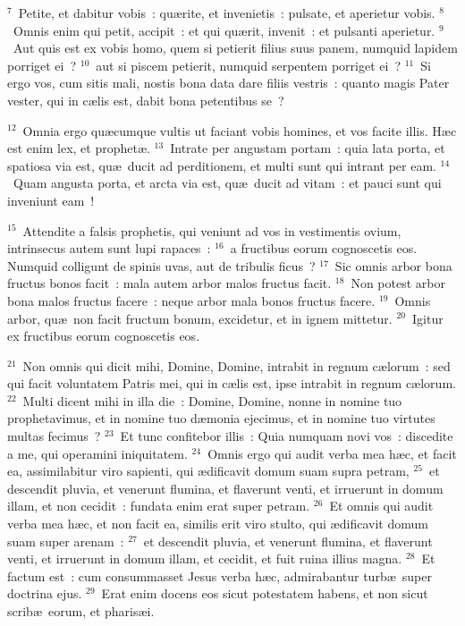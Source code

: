 ${}^{7}$~Petite, et dabitur vobis~: qu\ae rite, et invenietis~: pulsate, et aperietur vobis.
${}^{8}$~Omnis enim qui petit, accipit~: et qui qu\ae rit, invenit~: et pulsanti aperietur.
${}^{9}$~Aut quis est ex vobis homo, quem si petierit filius suus panem, numquid lapidem porriget ei~?
${}^{10}$~aut si piscem petierit, numquid serpentem porriget ei~?
${}^{11}$~Si ergo vos, cum sitis mali, nostis bona data dare filiis vestris~: quanto magis Pater vester, qui in c\ae lis est, dabit bona petentibus se~?


${}^{12}$~Omnia ergo qu\ae cumque vultis ut faciant vobis homines, et vos facite illis. H\ae c est enim lex, et prophet\ae .
${}^{13}$~Intrate per angustam portam~: quia lata porta, et spatiosa via est, qu\ae\ ducit ad perditionem, et multi sunt qui intrant per eam.
${}^{14}$~Quam angusta porta, et arcta via est, qu\ae\ ducit ad vitam~: et pauci sunt qui inveniunt eam~!


${}^{15}$~Attendite a falsis prophetis, qui veniunt ad vos in vestimentis ovium, intrinsecus autem sunt lupi rapaces~:
${}^{16}$~a fructibus eorum cognoscetis eos. Numquid colligunt de spinis uvas, aut de tribulis ficus~?
${}^{17}$~Sic omnis arbor bona fructus bonos facit~: mala autem arbor malos fructus facit.
${}^{18}$~Non potest arbor bona malos fructus facere~: neque arbor mala bonos fructus facere.
${}^{19}$~Omnis arbor, qu\ae\ non facit fructum bonum, excidetur, et in ignem mittetur.
${}^{20}$~Igitur ex fructibus eorum cognoscetis eos.


${}^{21}$~Non omnis qui dicit mihi, Domine, Domine, intrabit in regnum c\ae lorum~: sed qui facit voluntatem Patris mei, qui in c\ae lis est, ipse intrabit in regnum c\ae lorum.
${}^{22}$~Multi dicent mihi in illa die~: Domine, Domine, nonne in nomine tuo prophetavimus, et in nomine tuo d\ae monia ejecimus, et in nomine tuo virtutes multas fecimus~?
${}^{23}$~Et tunc confitebor illis~: Quia numquam novi vos~: discedite a me, qui operamini iniquitatem.
${}^{24}$~Omnis ergo qui audit verba mea h\ae c, et facit ea, assimilabitur viro sapienti, qui \ae dificavit domum suam supra petram,
${}^{25}$~et descendit pluvia, et venerunt flumina, et flaverunt venti, et irruerunt in domum illam, et non cecidit~: fundata enim erat super petram.
${}^{26}$~Et omnis qui audit verba mea h\ae c, et non facit ea, similis erit viro stulto, qui \ae dificavit domum suam super arenam~:
${}^{27}$~et descendit pluvia, et venerunt flumina, et flaverunt venti, et irruerunt in domum illam, et cecidit, et fuit ruina illius magna.
${}^{28}$~Et factum est~: cum consummasset Jesus verba h\ae c, admirabantur turb\ae\ super doctrina ejus.
${}^{29}$~Erat enim docens eos sicut potestatem habens, et non sicut scrib\ae\ eorum, et pharis\ae i.

